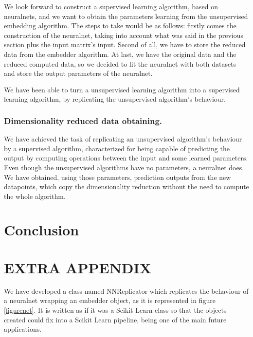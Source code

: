 \documentclass[a4paper,11pt,spanish]{report}
\begin{document}
We look forward to construct a supervised learning algorithm, based on neuralnets, and we want to obtain the parameters learning from the unsupervised embedding algorithm. The steps to take would be as follows: firstly comes the construction of the neuralnet, taking into account what was said in the previous section plus the input matrix's input. Second of all, we have to store the reduced data from the embedder algorithm. At last, we have the original data and the reduced computed data, so we decided to fit the neuralnet with both datasets and store the output parameters of the neuralnet.
\vspace{10pt}


We have been able to turn a unsupervised learning algorithm into a supervised learning algorithm, by replicating the unsupervised algorithm's behaviour.

\subsection{Dimensionality reduced data obtaining.}
\label{ssec:trans}

We have achieved the task of replicating an unsupervised algorithm's behaviour by a supervised algorithm, characterized for being capable of predicting the output by computing operations between the input and some learned parameters.
Even though the unsupervised algorithms have no parameters, a neuralnet does. We have obtained, using those parameters, prediction outputs from the new datapoints, which copy the dimensionality reduction without the need to compute the whole algorithm.




\chapter{Conclusion}
\label{chap:conc}



\chapter{EXTRA APPENDIX}
\label{chap:append}

We have developed a class named NNReplicator which replicates the behaviour of a neuralnet wrapping an embedder object, as it is represented in figure \ref{figurenet}. It is written as if it was a Scikit Learn class so that the objects created could fix into a Scikit Learn pipeline, being one of the main future applications.
\end{document}
